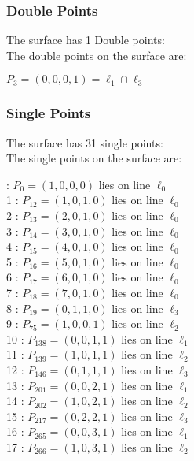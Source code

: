 \documentclass{article}
\begin{document}
{\subsubsection*{Double Points}
The surface has 1 Double points:\\
The double points on the surface are:\\
\begin{multicols}{2}
\noindent
$P_{3} = ( 0, 0, 0, 1 ) = \ell_{1} \cap \ell_{3} $\\
\end{multicols}
\subsubsection*{Single Points}
The surface has 31 single points:\\
The single points on the surface are:\\
\begin{multicols}{2}
 : $P_{0}=( 1, 0, 0, 0 )$ lies on line $\ell_{0}$\\
1 : $P_{12}=( 1, 0, 1, 0 )$ lies on line $\ell_{0}$\\
2 : $P_{13}=( 2, 0, 1, 0 )$ lies on line $\ell_{0}$\\
3 : $P_{14}=( 3, 0, 1, 0 )$ lies on line $\ell_{0}$\\
4 : $P_{15}=( 4, 0, 1, 0 )$ lies on line $\ell_{0}$\\
5 : $P_{16}=( 5, 0, 1, 0 )$ lies on line $\ell_{0}$\\
6 : $P_{17}=( 6, 0, 1, 0 )$ lies on line $\ell_{0}$\\
7 : $P_{18}=( 7, 0, 1, 0 )$ lies on line $\ell_{0}$\\
8 : $P_{19}=( 0, 1, 1, 0 )$ lies on line $\ell_{3}$\\
9 : $P_{75}=( 1, 0, 0, 1 )$ lies on line $\ell_{2}$\\
10 : $P_{138}=( 0, 0, 1, 1 )$ lies on line $\ell_{1}$\\
11 : $P_{139}=( 1, 0, 1, 1 )$ lies on line $\ell_{2}$\\
12 : $P_{146}=( 0, 1, 1, 1 )$ lies on line $\ell_{3}$\\
13 : $P_{201}=( 0, 0, 2, 1 )$ lies on line $\ell_{1}$\\
14 : $P_{202}=( 1, 0, 2, 1 )$ lies on line $\ell_{2}$\\
15 : $P_{217}=( 0, 2, 2, 1 )$ lies on line $\ell_{3}$\\
16 : $P_{265}=( 0, 0, 3, 1 )$ lies on line $\ell_{1}$\\
17 : $P_{266}=( 1, 0, 3, 1 )$ lies on line $\ell_{2}$\\

\end{multicols}}
\end{document}
